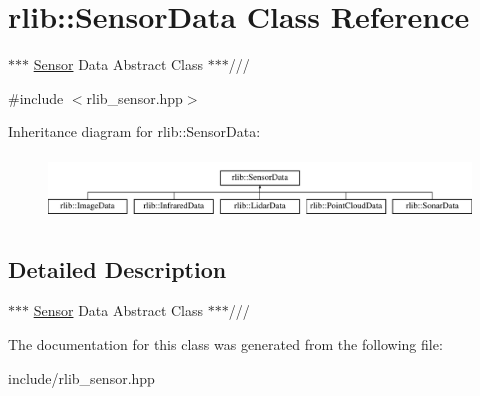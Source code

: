 \hypertarget{classrlib_1_1SensorData}{\section{rlib\-:\-:Sensor\-Data Class Reference}
\label{classrlib_1_1SensorData}
}


$\ast$$\ast$$\ast$ \hyperlink{classrlib_1_1Sensor}{Sensor} Data Abstract Class $\ast$$\ast$$\ast$///  




{\ttfamily \#include $<$rlib\-\_\-sensor.\-hpp$>$}

Inheritance diagram for rlib\-:\-:Sensor\-Data\-:\begin{figure}[H]
\begin{center}
\leavevmode
\includegraphics[height=1.709924cm]{classrlib_1_1SensorData}
\end{center}
\end{figure}


\subsection{Detailed Description}
$\ast$$\ast$$\ast$ \hyperlink{classrlib_1_1Sensor}{Sensor} Data Abstract Class $\ast$$\ast$$\ast$/// 

The documentation for this class was generated from the following file\-:\begin{DoxyCompactItemize}
\item 
include/rlib\-\_\-sensor.\-hpp\end{DoxyCompactItemize}
